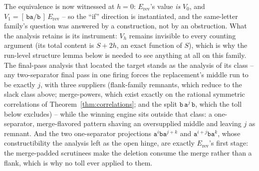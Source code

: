 \documentclass[runningheads,envcountsect]{llncs}
\begin{document}
The equivalence is now witnessed at $h = 0$: $E_{\mathrm{rev}}$'s value \emph{is} $V_0$, and $V_1 = [\,\mathtt b\mathtt a/\mathtt b\,]\,E_{\mathrm{rev}}$ -- so the ``if'' direction is instantiated, and the same-letter family's question was answered by a construction, not by an obstruction. What the analysis retains is its instrument: $V_h$ remains invisible to every counting argument (its total content is $S + 2h$, an exact function of $S$), which is why the run-level structure lemma below is needed to see anything at all on this family. The final-pass analysis that located the target stands as the analysis of its class -- any two-separator final pass in one firing forces the replacement's middle run to be exactly $j$, with three suppliers (flank-family remnants, which reduce to the slack class above; merge-powers, which exist exactly on the rational symmetric correlations of Theorem~\ref{thm:correlations}; and the split $\mathtt b\,\mathtt a^{j}\,\mathtt b$, which the toll below excludes) -- while the winning engine sits outside that class: a one-separator, merge-flavored pattern shaving an oversupplied middle and leaving $j$ as remnant. And the two one-separator projections $\mathtt a^i \mathtt b \mathtt a^{j+k}$ and $\mathtt a^{i+j} \mathtt b \mathtt a^k$, whose constructibility the analysis left as the open hinge, are exactly $E_{\mathrm{rev}}$'s first stage: the merge-padded scrutinees make the deletion consume the merge rather than a flank, which is why no toll ever applied to them.
\end{document}
